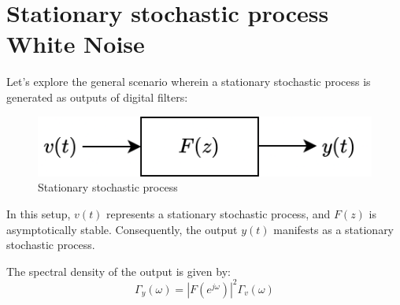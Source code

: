 \section{Stationary stochastic process  White Noise}

Let's explore the general scenario wherein a stationary stochastic process is generated as outputs of digital filters:
\begin{figure}[H]
    \centering
    \includegraphics[width=0.45\linewidth]{images/ssp.png}
    \caption{Stationary stochastic process}
\end{figure}
In this setup, $v(t)$ represents a stationary stochastic process, and $F(z)$ is asymptotically stable. 
Consequently, the output $y(t)$ manifests as a stationary stochastic process.
\begin{theorem}
    The spectral density of the output is given by:
    \[\Gamma_y(\omega)=\left\lvert F(e^{j\omega})\right\rvert^2 \Gamma_v(\omega) \]
\end{theorem}

